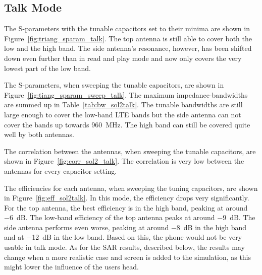 \FloatBarrier
\subsection{Talk Mode}

The S-parameters with the tunable capacitors set to their minima are shown in Figure~\ref{fig:triang_sparam_talk}. The top antenna is still able to cover both the low and the high band. The side antenna's resonance, however, has been shifted down even further than in read and play mode and now only covers the very lowest part of the low band.

The S-parameters, when sweeping the tunable capacitors, are shown in Figure~\ref{fig:tiang_sparam_sweep_talk}. The maximum impedance-bandwidths are summed up in Table~\ref{tab:bw_sol2talk}. The tunable bandwidths are still large enough to cover the low-band LTE bands but the side antenna can not cover the bands up towards \SI{960}{MHz}. The high band can still be covered quite well by both antennas.

The correlation between the antennas, when sweeping the tunable capacitors, are shown in Figure~\ref{fig:corr_sol2_talk}. The correlation is very low between the antennas for every capacitor setting.

The efficiencies for each antenna, when sweeping the tuning capacitors, are shown in Figure~\ref{fig:eff_sol2talk}. In this mode, the efficiency drops very significantly. For the top antenna, the best efficiency is in the high band, peaking at around \SI{-6}{dB}. The low-band efficiency of the top antenna peaks at around \SI{-9}{dB}. The side antenna performs even worse, peaking at around \SI{-8}{dB} in the high band and at \SI{-12}{dB} in the low band. Based on this, the phone would not be very usable in talk mode. As for the SAR results, described below, the results may change when a more realistic case and screen is added to the simulation, as this might lower the influence of the users head.

